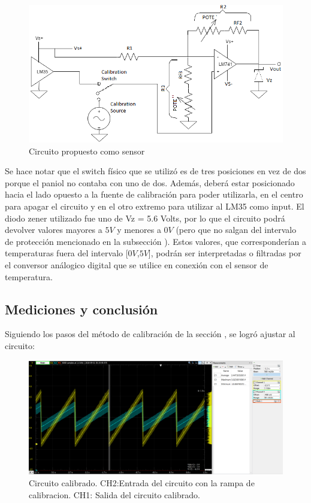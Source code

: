\documentclass[../../main.tex]{subfiles}
\begin{document}
\begin{figure}[H]	%
	\centering
	\includegraphics[scale=1.2]{imagenes/combinacion_circuito.png}
	\caption{Circuito propuesto como sensor}
	\label{fig:ej6_combinacion_circuito}
\end{figure}

Se hace notar que el switch físico que se utilizó es de tres posiciones en vez de dos porque el paniol no contaba con uno de dos. Además, deberá estar posicionado hacia el lado opuesto a la fuente de calibración para poder utilizarla, en el centro para apagar el circuito y en el otro extremo para utilizar al LM35 como input.
El diodo zener utilizado fue uno de Vz = 5.6 Volts, por lo que el circuito podrá devolver valores mayores a $5V$ y menores a $0V$ (pero que no salgan del intervalo de protección mencionado en la subsección ). Estos valores, que corresponderían a temperaturas fuera del intervalo [$0V$,$5V$], podrán ser interpretadas o filtradas por el conversor análogico digital que se utilice en conexión con el sensor de temperatura.
   
\subsection{Mediciones y conclusión}

Siguiendo los pasos del método de calibración de la sección , se logró ajustar al circuito:

\begin{figure}[H]	%
	\centering
	\includegraphics[scale=0.4]{imagenes/sensor_calibrado.png}
	\caption{Circuito calibrado. CH2:Entrada del circuito con la rampa de calibracion. CH1: Salida del circuito calibrado. }
	\label{fig:ej6_sensor_calibrado}
\end{figure}
\end{document}
